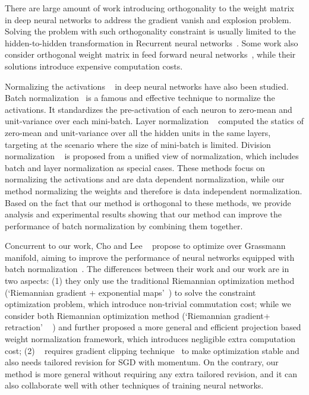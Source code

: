 \documentclass[twocolumn]{article}
\begin{document}
There are large amount of work introducing orthogonality to the weight matrix ~\cite{2016_ICML_Arjovsky,2016_NIPS_Wisdom,2016_CoRR_Dorobantu,2017_ICML_Eugene,2017_Corr_Harandi,2016_Corr_Ozay,Huang_2017_arxiv} in deep neural networks to address the gradient vanish and explosion problem. Solving the problem with such orthogonality constraint is usually limited to the hidden-to-hidden transformation in Recurrent neural networks~\cite{2016_ICML_Arjovsky,2016_NIPS_Wisdom,2016_CoRR_Dorobantu,2017_ICML_Eugene}. Some work also consider orthogonal weight matrix in feed forward neural networks~\cite{2017_Corr_Harandi,2016_Corr_Ozay,Huang_2017_arxiv}, while their solutions introduce expensive computation costs.

Normalizing the activations ~\cite{2015_ICML_Ioffe,2016_CoRR_Ba,2017_ICLR_Ren} in deep neural networks have also been studied. Batch normalization~\cite{2015_ICML_Ioffe} is a famous and effective technique to normalize the activations. It standardizes the  pre-activation of each neuron to zero-mean and unit-variance over each mini-batch. Layer normalization ~\cite{2016_CoRR_Ba} computed the  statics of zero-mean and unit-variance over all the hidden units in the same layers, targeting at the scenario where the size of mini-batch is limited. Division normalization ~\cite{2017_ICLR_Ren} is proposed from a unified view of normalization, which includes batch and layer normalization as special cases. These methods focus on normalizing the activations and are data dependent normalization, while our method normalizing the weights and therefore is data independent normalization. Based on the fact that our method is orthogonal to these methods, we provide analysis and experimental results showing that our method can improve the performance of batch normalization by combining them together.

Concurrent to our work, Cho and Lee ~\cite{2017_Corr_Cho} propose to optimize over Grassmann manifold,  aiming to improve the performance of neural networks equipped with batch normalization~\cite{2015_ICML_Ioffe}.
The differences between their work and our work are in two aspects: (1) they only use the traditional Riemannian optimization method (`Riemannian gradient + exponential maps'~\cite{2004_Math}) to solve the constraint optimization problem, which introduce non-trivial commutation cost; while we consider both Riemannian optimization method (`Riemannian gradient+ retraction' ~\cite{2006_ICASSP_Absil} ) and further proposed a more general and efficient projection based weight normalization framework, which introduces negligible extra computation cost; (2) ~\cite{2017_Corr_Cho} requires gradient clipping technique~\cite{2013_ICML_Pascanu} to make optimization stable and also needs tailored revision for SGD with momentum. On the contrary, our method is more general without requiring any extra tailored revision, and it can also collaborate well with other techniques of training neural networks.
\end{document}
